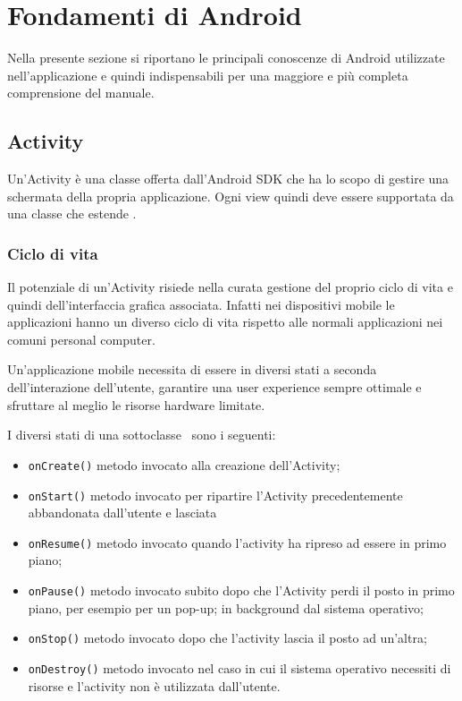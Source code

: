 \documentclass[../ManualeSviluppatore.tex]{subfiles}
\begin{document}
\begin{appendices}
	\label{sec:FondamentiDiAndroid}
	\section{Fondamenti di Android}
		Nella presente sezione si riportano le principali conoscenze di Android utilizzate nell'applicazione e quindi indispensabili per una maggiore e più completa comprensione del manuale.
	
			
		
		\subsection{Activity}
			Un'Activity è una classe offerta dall'Android SDK che ha lo scopo di gestire una schermata della propria applicazione. Ogni view quindi deve essere supportata da una classe che estende \Activity.
		
			\subsubsection{Ciclo di vita}
				Il potenziale di un'Activity risiede nella curata gestione del proprio ciclo di vita e quindi dell'interfaccia grafica associata. Infatti nei dispositivi mobile le applicazioni hanno un diverso ciclo di vita rispetto alle normali applicazioni nei comuni personal computer.
				
				Un'applicazione mobile necessita di essere in diversi stati a seconda dell'interazione dell'utente, garantire una user experience sempre ottimale e sfruttare al meglio le risorse hardware limitate.
				
				I diversi stati di una sottoclasse \Activity\ sono i seguenti:
				\begin{itemize}
					\item \lstinline|onCreate()| metodo invocato alla creazione dell'Activity;
					\item \lstinline|onStart()| metodo invocato per ripartire l'Activity precedentemente abbandonata dall'utente e lasciata
					\item \lstinline|onResume()| metodo invocato quando l'activity ha ripreso ad essere in primo piano;
					\item \lstinline|onPause()| metodo invocato subito dopo che l'Activity perdi il posto in primo piano, per esempio per un pop-up;
					 in background dal sistema operativo;
					\item \lstinline|onStop()| metodo invocato dopo che l'activity lascia il posto ad un'altra;
					\item \lstinline|onDestroy()| metodo invocato nel caso in cui il sistema operativo necessiti di risorse e l'activity non è utilizzata dall'utente.
				\end{itemize}
				

\end{appendices}
\end{document}

